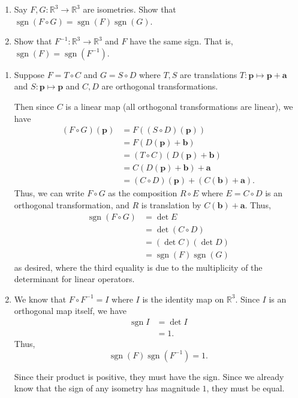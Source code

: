 \documentclass[12 pt, letterpaper]{hmcpset}
\begin{document}
\begin{problem}[Problem 1.]
	\begin{enumerate}
		 \item Say $F, G : \mathbb{R}^{3} \to \mathbb{R}^{3}$ are isometries. Show that $\operatorname{sgn}(F \circ G) = \operatorname{sgn}(F) \operatorname{sgn}(G)$.
		\item Show that $F^{-1} : \mathbb{R}^{3} \to \mathbb{R}^{3}$ and $F$ have the same sign. That is, $\operatorname{sgn}(F) = \operatorname{sgn}(F^{-1})$.
	\end{enumerate}
\end{problem}

\begin{solution}
	\begin{enumerate}
		\item Suppose $F = T \circ C$ and $G = S \circ D$ where $T, S$ are translations $T : \mathbf{p} \mapsto \mathbf{p} + \mathbf{a}$ and $S : \mathbf{p} \mapsto \mathbf{p}$ and $C, D$ are orthogonal transformations. 

			Then since $C$ is a linear map (all orthogonal transformations are linear), we have
			\[
				\begin{split}
					(F \circ G) (\mathbf{p}) & = F((S \circ D)(\mathbf{p})) \\
								 & = F(D(\mathbf{p}) + \mathbf{b}) \\
								 & = (T \circ C)(D(\mathbf{p}) + \mathbf{b}) \\
								 & = C(D(\mathbf{p}) + \mathbf{b}) + \mathbf{a} \\
								 & = (C \circ D)(\mathbf{p}) + (C(\mathbf{b}) + \mathbf{a}).
				\end{split}
			\]
			Thus, we can write $F \circ G$ as the composition $R \circ E$ where $E = C \circ D$ is an orthogonal transformation, and $R$ is translation by $C(\mathbf{b}) + \mathbf{a}$. Thus,
			\[
				\begin{split}
					\operatorname{sgn}(F \circ G) & = \det E \\
								      & = \det (C \circ D) \\
								      & = (\det C) (\det D) \\
								      & = \operatorname{sgn} (F) \operatorname{sgn} (G)
				\end{split}
			\]
			as desired, where the third equality is due to the multiplicity of the determinant for linear operators.
		\item We know that $F \circ F^{-1} = I$ where $I$ is the identity map on $\mathbb{R}^{3}$. Since $I$ is an orthogonal map itself, we have
			\[
				\begin{split}
					\operatorname{sgn} I & = \det I \\
							     & = 1.
				\end{split}
			\]
			Thus,
			\[
				\operatorname{sgn}(F) \operatorname{sgn}(F^{-1}) = 1.
			\] 

			Since their product is positive, they must have the sign. Since we already know that the sign of any isometry has magnitude $1$, they must be equal.
	\end{enumerate}
\end{solution}
\end{document}
